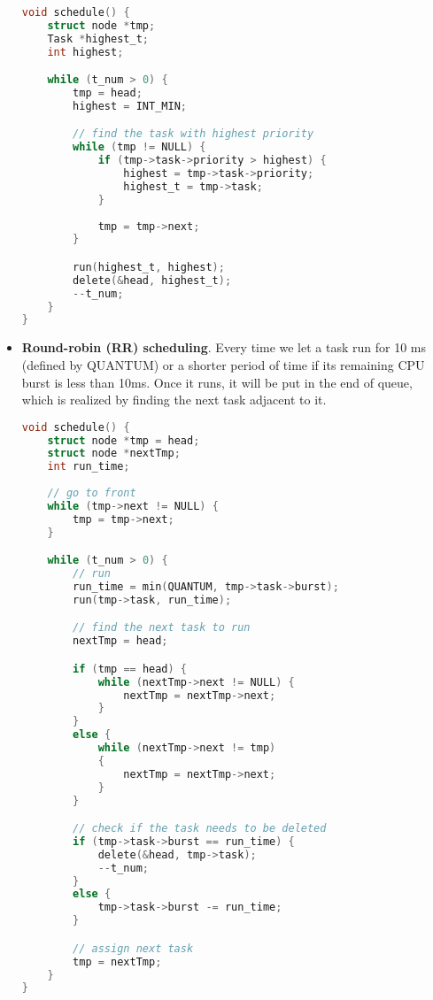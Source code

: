 \documentclass{article}
\begin{document}
\begin{itemize}
    \begin{lstlisting}[language=c, caption={schedule() for Priority scheduling}]
void schedule() {
    struct node *tmp;
    Task *highest_t;
    int highest;

    while (t_num > 0) {
        tmp = head;
        highest = INT_MIN;

        // find the task with highest priority
        while (tmp != NULL) {
            if (tmp->task->priority > highest) {
                highest = tmp->task->priority;
                highest_t = tmp->task;
            }
            
            tmp = tmp->next;
        }

        run(highest_t, highest);
        delete(&head, highest_t);
        --t_num;
    }
}
    \end{lstlisting}
    
    \item \textbf{Round-robin (RR) scheduling}. Every time we let a task run for 10 ms (defined by QUANTUM) or a shorter period of time if its remaining CPU burst is less than 10ms. Once it runs, it will be put in the end of queue, which is realized by finding the next task adjacent to it.
    
    \begin{lstlisting}[language=c, caption={schedule() for RR}]
void schedule() {
    struct node *tmp = head;
    struct node *nextTmp;
    int run_time;
    
    // go to front
    while (tmp->next != NULL) {
        tmp = tmp->next;
    }

    while (t_num > 0) {
        // run
        run_time = min(QUANTUM, tmp->task->burst);
        run(tmp->task, run_time);

        // find the next task to run
        nextTmp = head;

        if (tmp == head) {
            while (nextTmp->next != NULL) {
                nextTmp = nextTmp->next;
            }
        }
        else {
            while (nextTmp->next != tmp)
            {
                nextTmp = nextTmp->next;
            }            
        }

        // check if the task needs to be deleted
        if (tmp->task->burst == run_time) {           
            delete(&head, tmp->task);
            --t_num;
        }
        else {
            tmp->task->burst -= run_time;
        }

        // assign next task
        tmp = nextTmp;
    }
}
    \end{lstlisting}


\end{itemize}
\end{document}
